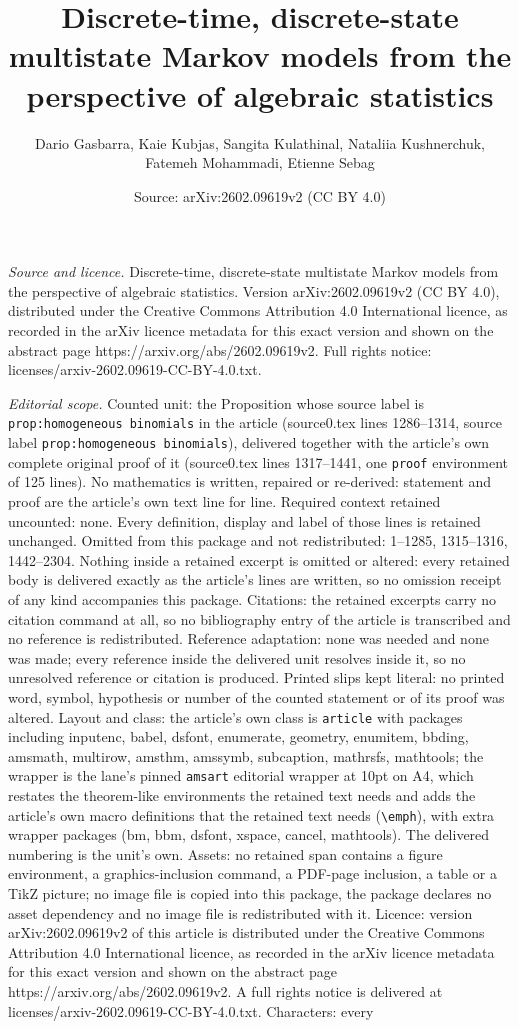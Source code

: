 \documentclass[10pt,a4paper]{amsart}
\title[Discrete-time, discrete-state multistate Markov models from ]{Discrete-time, discrete-state multistate Markov models from the perspective of algebraic statistics}
\author{Dario Gasbarra, Kaie Kubjas, Sangita Kulathinal, Nataliia Kushnerchuk, Fatemeh Mohammadi, Etienne Sebag}
\date{Source: arXiv:2602.09619v2 (CC BY 4.0)}
\renewcommand{\emph}[1]{\textit{#1}}
\begin{document}
\maketitle

\noindent\emph{Source and licence.} Discrete-time, discrete-state multistate Markov models from the perspective of algebraic statistics. Version arXiv:2602.09619v2 (CC BY 4.0), distributed under the Creative Commons Attribution 4.0 International licence, as recorded in the arXiv licence metadata for this exact version and shown on the abstract page https://arxiv.org/abs/2602.09619v2. Full rights notice: licenses/arxiv-2602.09619-CC-BY-4.0.txt.\par\smallskip

\noindent\textit{Editorial scope.} Counted unit: the Proposition whose source label is \texttt{prop:homogeneous binomials} in the article (source0.tex lines 1286--1314, source label \texttt{prop:homogeneous binomials}), delivered together with the article's own complete original proof of it (source0.tex lines 1317--1441, one \texttt{proof} environment of 125 lines). No mathematics is written, repaired or re-derived: statement and proof are the article's own text line for line. Required context retained uncounted: none. Every definition, display and label of those lines is retained unchanged. Omitted from this package and not redistributed: 1--1285, 1315--1316, 1442--2304. Nothing inside a retained excerpt is omitted or altered: every retained body is delivered exactly as the article's lines are written, so no omission receipt of any kind accompanies this package. Citations: the retained excerpts carry no citation command at all, so no bibliography entry of the article is transcribed and no reference is redistributed. Reference adaptation: none was needed and none was made; every reference inside the delivered unit resolves inside it, so no unresolved reference or citation is produced. Printed slips kept literal: no printed word, symbol, hypothesis or number of the counted statement or of its proof was altered. Layout and class: the article's own class is \texttt{article} with packages including inputenc, babel, dsfont, enumerate, geometry, enumitem, bbding, amsmath, multirow, amsthm, amssymb, subcaption, mathrsfs, mathtools; the wrapper is the lane's pinned \texttt{amsart} editorial wrapper at 10pt on A4, which restates the theorem-like environments the retained text needs and adds the article's own macro definitions that the retained text needs (\texttt{\textbackslash emph}), with extra wrapper packages (bm, bbm, dsfont, xspace, cancel, mathtools). The delivered numbering is the unit's own. Assets: no retained span contains a figure environment, a graphics-inclusion command, a PDF-page inclusion, a table or a TikZ picture; no image file is copied into this package, the package declares no asset dependency and no image file is redistributed with it. Licence: version arXiv:2602.09619v2 of this article is distributed under the Creative Commons Attribution 4.0 International licence, as recorded in the arXiv licence metadata for this exact version and shown on the abstract page https://arxiv.org/abs/2602.09619v2. A full rights notice is delivered at licenses/arxiv-2602.09619-CC-BY-4.0.txt. Characters: every 
\end{document}
